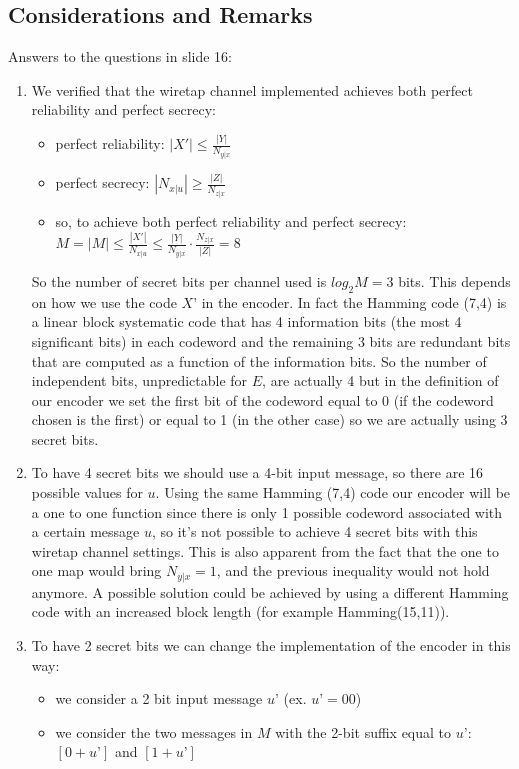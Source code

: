 \documentclass{report}
\begin{document}
\subsection*{Considerations and Remarks}
Answers to the questions in slide 16: 
\begin{enumerate}
\item We verified that the wiretap channel implemented achieves both perfect reliability and perfect
secrecy:
\begin{itemize}
\item perfect reliability: $|X'|\leq \frac{|Y|}{N_{y|x}}$
\item perfect secrecy: $|N_{x|u}|\geq \frac{|Z|}{N_{z|x}}$
\item so, to achieve both perfect reliability and perfect secrecy: $M=|M|\leq \frac{|X'|}{N_{x|u}}\leq \frac{|Y|}{N_{y|x}}\cdot\frac{N_{z|x}}{|Z|}=8$
\end{itemize}
So the number of secret bits per channel used is $log_2M = 3$ bits. This depends on how we use the code $X’$ in the encoder. In fact the Hamming code (7,4) is a linear block systematic code that has 4 information bits (the most 4 significant bits) in each codeword and the remaining 3 bits are redundant bits that are computed as a function of the information bits. So the number of independent bits, unpredictable for $E$, are actually 4 but in the definition of our encoder we set the first bit of the codeword equal to 0 (if the codeword chosen is the first) or equal to 1 (in the other case) so we are actually using 3 secret bits.\\
\item To have 4 secret bits we should use a 4-bit input message, so there are 16 possible values for $u$.  Using the same Hamming (7,4) code our encoder will be a one to one function since there is only 1  possible codeword associated with a certain message $u$, so it’s not possible to achieve 4 secret bits  with this wiretap channel settings. This is also apparent from the fact that the one to one map would bring $N_{y|x}=1$, and the previous inequality would not hold anymore. A possible solution could be achieved by using a different Hamming code with an increased block length (for example Hamming(15,11)). 
\item To have 2 secret bits we can change the implementation of the encoder in this way:
\begin{itemize}
\item we consider a 2 bit input message $u’$ (ex. $u’=00$)
\item we consider the two messages in $M$ with the 2-bit suffix equal to $u’$: $[0 + u’]$ and $[1 + u’]$ 

\end{itemize}
\end{enumerate}
\end{document}
